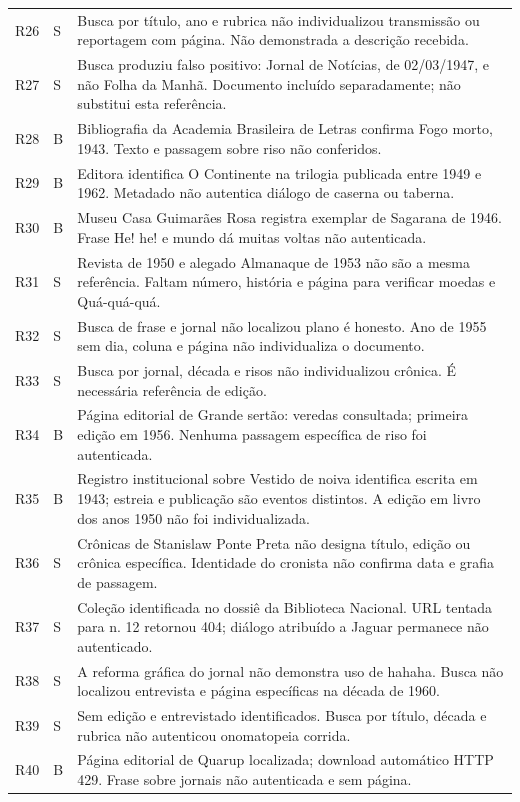 \begin{longtable}{p{}p{}p{}}
R26 & S & Busca por título, ano e rubrica não individualizou transmissão ou reportagem com página. Não demonstrada a descrição recebida.\\
R27 & S & Busca produziu falso positivo: Jornal de Notícias, de 02/03/1947, e não Folha da Manhã. Documento incluído separadamente; não substitui esta referência.\\
R28 & B & Bibliografia da Academia Brasileira de Letras confirma Fogo morto, 1943. Texto e passagem sobre riso não conferidos.\\
R29 & B & Editora identifica O Continente na trilogia publicada entre 1949 e 1962. Metadado não autentica diálogo de caserna ou taberna.\\
R30 & B & Museu Casa Guimarães Rosa registra exemplar de Sagarana de 1946. Frase He! he! e mundo dá muitas voltas não autenticada.\\
R31 & S & Revista de 1950 e alegado Almanaque de 1953 não são a mesma referência. Faltam número, história e página para verificar moedas e Quá-quá-quá.\\
R32 & S & Busca de frase e jornal não localizou plano é honesto. Ano de 1955 sem dia, coluna e página não individualiza o documento.\\
R33 & S & Busca por jornal, década e risos não individualizou crônica. É necessária referência de edição.\\
R34 & B & Página editorial de Grande sertão: veredas consultada; primeira edição em 1956. Nenhuma passagem específica de riso foi autenticada.\\
R35 & B & Registro institucional sobre Vestido de noiva identifica escrita em 1943; estreia e publicação são eventos distintos. A edição em livro dos anos 1950 não foi individualizada.\\
R36 & S & Crônicas de Stanislaw Ponte Preta não designa título, edição ou crônica específica. Identidade do cronista não confirma data e grafia de passagem.\\
R37 & S & Coleção identificada no dossiê da Biblioteca Nacional. URL tentada para n. 12 retornou 404; diálogo atribuído a Jaguar permanece não autenticado.\\
R38 & S & A reforma gráfica do jornal não demonstra uso de hahaha. Busca não localizou entrevista e página específicas na década de 1960.\\
R39 & S & Sem edição e entrevistado identificados. Busca por título, década e rubrica não autenticou onomatopeia corrida.\\
R40 & B & Página editorial de Quarup localizada; download automático HTTP 429. Frase sobre jornais não autenticada e sem página.\\

\end{longtable}
